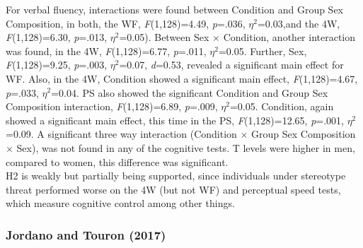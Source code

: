 \documentclass[
  stu,floatsintext]{apa7}
\begin{document}
For verbal fluency, interactions were found between Condition and Group Sex Composition, in both, the WF, \emph{F}(1,128)=4.49, \emph{p}=.036, \(\eta^{2}\)=0.03,and the 4W, \emph{F}(1,128)=6.30, \emph{p}=.013, \(\eta^{2}\)=0.05).
Between Sex \(\times\) Condition, another interaction was found, in the 4W, \emph{F}(1,128)=6.77, \emph{p}=.011, \(\eta^{2}\)=0.05.
Further, Sex, \emph{F}(1,128)=9.25, \emph{p}=.003, \(\eta^{2}\)=0.07, \emph{d}=0.53, revealed a significant main effect for WF.
Also, in the 4W, Condition showed a significant main effect, \emph{F}(1,128)=4.67, \emph{p}=.033, \(\eta^{2}\)=0.04.
PS also showed the significant Condition and Group Sex Composition interaction, \emph{F}(1,128)=6.89, \emph{p}=.009, \(\eta^{2}\)=0.05.
Condition, again showed a significant main effect, this time in the PS, \emph{F}(1,128)=12.65, \emph{p}=.001, \(\eta^{2}\)=0.09.
A significant three way interaction (Condition \(\times\) Group Sex Composition \(\times\) Sex), was not found in any of the cognitive tests.
T levels were higher in men, compared to women, this difference was significant.\\
H2 is weakly but partially being supported, since individuals under stereotype threat performed worse on the 4W (but not WF) and perceptual speed tests, which measure cognitive control among other things.

\subsubsection{Jordano and Touron (2017)}\label{jordanoprimingperformancerelatedconcerns2017}
\end{document}
